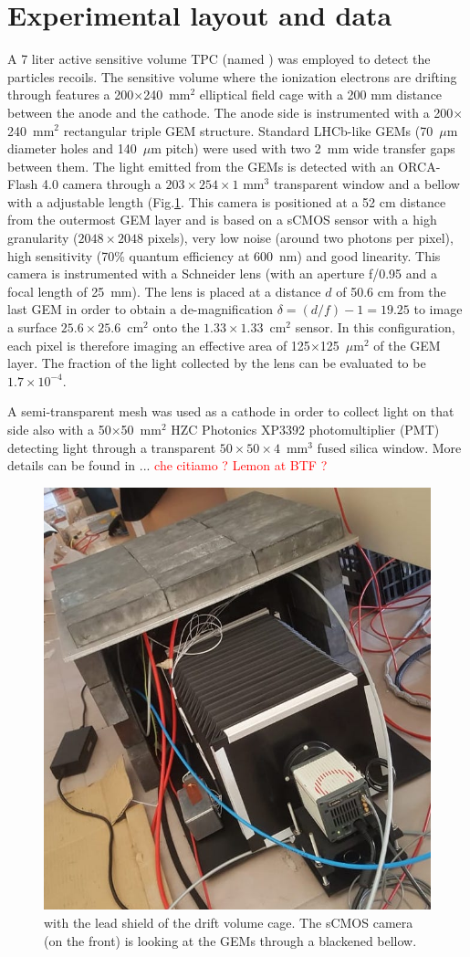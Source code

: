 \documentclass[12pt]{iopart}
\begin{document}
 \section{Experimental layout and data }
 A 7 liter active sensitive volume TPC  (named \lemon  \cite{paperBTF} ) was employed to detect the particles recoils. The sensitive volume where the ionization electrons are drifting through
features   a  200$\times$240~mm$^2$ elliptical field cage with a 200 mm distance between the anode and the cathode. The anode side is instrumented with a 200$\times$240~mm$^2$ rectangular triple  GEM structure.
Standard LHCb-like \cite{bib:thesis} GEMs  (70~$\mu$m diameter holes and 140~$\mu$m pitch) were used with two 2~mm wide transfer gaps between them. The light emitted from the GEMs is detected with   an ORCA-Flash 4.0 camera \cite{ORCAcamera} through a  $203\times254\times1$ mm$^3$ transparent window and a  bellow with a adjustable length (Fig.\ref{fig:LemonShielded}.  This camera is positioned  at a 52 cm  distance from the outermost  GEM layer and is based on a sCMOS sensor with a high granularity ($2048\times2048$ pixels), very low noise (around two photons per pixel), high sensitivity (70\%  quantum efficiency at  600~nm) and good linearity. This camera is instrumented with a Schneider lens (with an aperture f/0.95 and a focal length of 25~mm). The lens is placed at a distance $d$ of 50.6 cm from the last GEM
in order to obtain a de-magnification
$\delta = (d/f) - 1 = 19.25$ to
image a surface $25.6 \times 25.6$~cm$^2$ onto the
$1.33 \times 1.33$~cm$^2$ sensor.
In this configuration, each pixel
 is therefore imaging  an effective area of 125$\times$125~$\mu$m$^2$ of the GEM layer. The fraction of the light collected by the lens can be evaluated \cite{bib:jinst_orange1} to be $1.7 \times 10^{-4}$.

A semi-transparent mesh was used as a cathode in order to collect light on that side also with a 50$\times$50~mm$^2$ HZC Photonics XP3392 photomultiplier \cite{PMTPhotonics} (PMT) detecting light through a transparent $50\times50\times4$~mm$^3$ fused silica window. More details can be found in ... \textcolor{red}{che citiamo ? Lemon at BTF ? }


 
\begin{figure}[ht]
	\centering
	\includegraphics[width=0.45\linewidth]{LEMON-Shielded.jpg}
  	\caption{\lemon with the lead shield of the  drift volume cage. The sCMOS camera (on the front) is looking at the GEMs through a blackened bellow.}
  	\label{fig:LemonShielded}
\end{figure}
\end{document}
